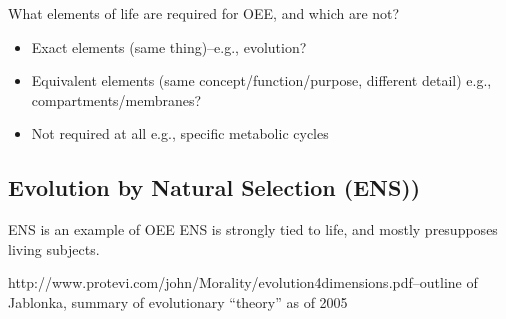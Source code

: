 What elements of life are required for OEE, and which are not?

\begin{itemize}
	\item
	      Exact elements (same thing)--e.g., evolution?
	\item
	      Equivalent elements (same concept/function/purpose, different detail) e.g., compartments/membranes?
	\item
	      Not required at all e.g., specific metabolic cycles
\end{itemize}
\subsection{Evolution by Natural Selection (ENS))}\label{ens-evolution-by-natural-selection}

ENS is an example of OEE
ENS is strongly tied to life, and mostly presupposes living subjects.

http://www.protevi.com/john/Morality/evolution4dimensions.pdf--outline
of Jablonka, summary of evolutionary ``theory'' as of 2005

